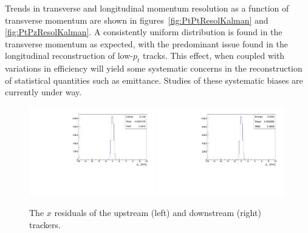   Trends in transverse and longitudinal momentum resolution as a function of transverse momentum are shown in figures~\ref{fig:PtPtResolKalman} and \ref{fig:PtPzResolKalman}. A consistently uniform distribution is found in the transverse momentum as expected, with the predominant issue found in the longitudinal reconstruction of low-$p_t$ tracks. This effect, when coupled with variations in efficiency will yield some systematic concerns in the reconstruction of statistical quantities such as emittance. Studies of these systematic biases are currently under way.

  \begin{figure}[p]
    \begin{center}
      \includegraphics[width=0.49\textwidth, angle=0]{08-Performance/upstream_x_residual.pdf}
      \includegraphics[width=0.49\textwidth, angle=0]{08-Performance/downstream_x_residual.pdf}
      \caption{\label{fig:XResidKalman} The $x$ residuals of the upstream (left) and downstream (right) trackers.}
    \end{center}
  \end{figure}
  
